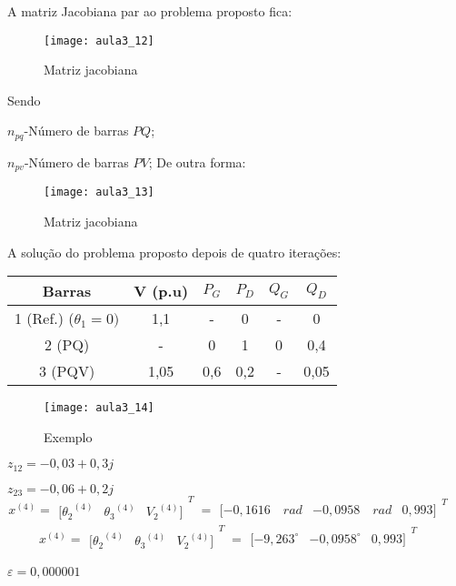A matriz Jacobiana par ao problema proposto fica:

\begin{figure}[H]
\begin{centering}
\texttt{[image: aula3\_12]}\protect\caption{\label{fig:aula3_12} Matriz jacobiana }
\end{centering}
\end{figure}
Sendo

$n_{pq}$-Número de barras $PQ$;

$n_{pv}$-Número de barras $PV$;
De outra forma:
\begin{figure}[H]
\begin{centering}
\texttt{[image: aula3\_13]}\protect\caption{\label{fig:aula3_13} Matriz jacobiana }
\end{centering}
\end{figure}

A solução do problema proposto depois de quatro iterações:

\begin{tabular}{|c|c|c|c|c|c|}
\hline 
Barras & V (p.u) & $P_{G}$ & $P_{D}$ & $Q_{G}$ & $Q_{D}$\tabularnewline
\hline 
\hline 
1 (Ref.) ($\theta_{1}=0)$ & 1,1 & - & 0 & - & 0\tabularnewline
\hline 
2 (PQ) & - & 0 & 1 & 0 & 0,4\tabularnewline
\hline 
3 (PQV) & 1,05 & 0,6 & 0,2 & - & 0,05\tabularnewline
\hline 
\end{tabular}
\begin{figure}[H]
\begin{centering}
\texttt{[image: aula3\_14]}\protect\caption{\label{fig:aula3_14} Exemplo }
\end{centering}
\end{figure}

$z_{12}=-0,03+0,3j$

$z_{23}=-0,06+0,2j$
\[
{ x }^{ (4) }={ \begin{matrix} { [\theta _{ 2 } }^{ (4) } & { \theta _{ 3 } }^{ (4) } & { V_{ 2 } }^{ (4) }] \end{matrix} }_{ \quad }^{ T }={ \begin{matrix} [-0,1616\quad rad & -0,0958\quad rad & 0,993] \end{matrix} }_{ \quad }^{ T }\quad 
\]
\[
{ x }^{ (4) }={ \begin{matrix} { [\theta _{ 2 } }^{ (4) } & { \theta _{ 3 } }^{ (4) } & { V_{ 2 } }^{ (4) }] \end{matrix} }_{ \quad }^{ T }={ \begin{matrix} [-{ 9,263 }^{ \circ } & { -0,0958 }^{ \circ } & 0,993] \end{matrix} }_{ \quad }^{ T }\quad 
\]

$\varepsilon=0,000001$







